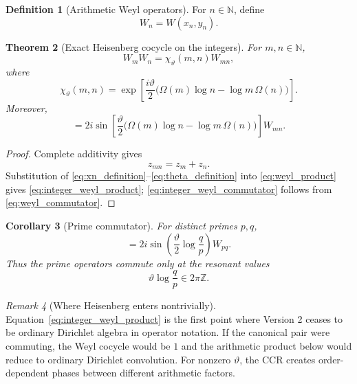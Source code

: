 \documentclass[11pt]{amsart}
\numberwithin{equation}{section}
\theoremstyle{plain}
\newtheorem{theorem}{Theorem}[section]
\newtheorem{corollary}[theorem]{Corollary}
\theoremstyle{definition}
\newtheorem{definition}[theorem]{Definition}
\theoremstyle{remark}
\newtheorem{remark}[theorem]{Remark}
\newcommand{\N}{\mathbb{N}}
\newcommand{\Om}{\Omega}
\begin{document}
\begin{definition}[Arithmetic Weyl operators]
\label{def:arithmetic_weyl_operator}
For $n\in\N$, define
\begin{equation}
W_n=W(x_n,y_n).
\label{eq:Wn_definition}
\end{equation}
\end{definition}

\begin{theorem}[Exact Heisenberg cocycle on the integers]
\label{thm:integer_weyl_cocycle}
For $m,n\in\N$,
\begin{equation}
W_mW_n
=
\chi_{\vartheta}(m,n)W_{mn},
\label{eq:integer_weyl_product}
\end{equation}
where
\begin{equation}
\chi_{\vartheta}(m,n)
=
\exp\!\left[
\frac{i\vartheta}{2}
\bigl(\Om(m)\log n-\log m\,\Om(n)\bigr)
\right].
\label{eq:chi_definition}
\end{equation}
Moreover,
\begin{equation}
[W_m,W_n]
=
2i\sin\!\left[
\frac{\vartheta}{2}
\bigl(\Om(m)\log n-\log m\,\Om(n)\bigr)
\right]W_{mn}.
\label{eq:integer_weyl_commutator}
\end{equation}
\end{theorem}

\begin{proof}
Complete additivity gives
\begin{equation}
z_{mn}=z_m+z_n.
\label{eq:phase_space_additivity}
\end{equation}
Substitution of \eqref{eq:xn_definition}--\eqref{eq:theta_definition} into
\eqref{eq:weyl_product} gives \eqref{eq:integer_weyl_product};
\eqref{eq:integer_weyl_commutator} follows from
\eqref{eq:weyl_commutator}.
\end{proof}

\begin{corollary}[Prime commutator]
\label{cor:prime_commutator}
For distinct primes $p,q$,
\begin{equation}
[W_p,W_q]
=
2i\sin\!\left(\frac{\vartheta}{2}\log\frac{q}{p}\right)W_{pq}.
\label{eq:prime_commutator}
\end{equation}
Thus the prime operators commute only at the resonant values
\begin{equation}
\vartheta\log\frac{q}{p}\in2\pi\mathbb Z.
\label{eq:prime_commutation_resonance}
\end{equation}
\end{corollary}

\begin{remark}[Where Heisenberg enters nontrivially]
\label{rem:where_heisenberg_enters}
Equation~\eqref{eq:integer_weyl_product} is the first point where Version 2
ceases to be ordinary Dirichlet algebra in operator notation.  If the
canonical pair were commuting, the Weyl cocycle would be $1$ and the
arithmetic product below would reduce to ordinary Dirichlet convolution.
For nonzero $\vartheta$, the CCR creates order-dependent phases between
different arithmetic factors.
\end{remark}
\end{document}
